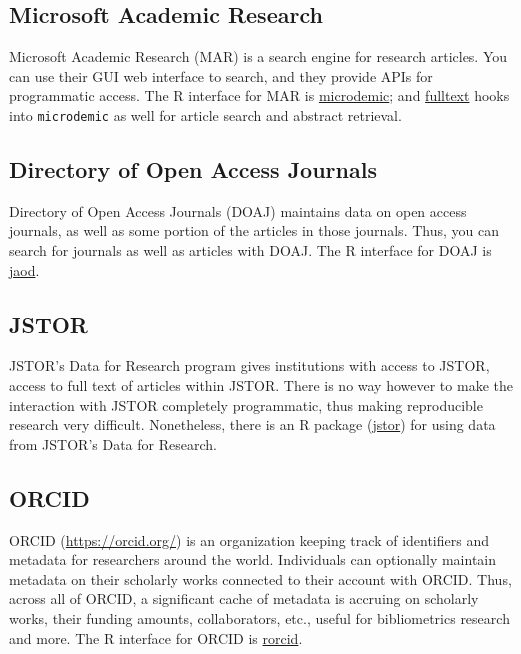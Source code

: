 \documentclass[author-year, review, 11pt]{components/elsarticle} %
\begin{document}
\hypertarget{microsoft-academic-research}{%
\subsection{Microsoft Academic
Research}\label{microsoft-academic-research}}

Microsoft Academic Research (MAR) is a search engine for research
articles. You can use their GUI web interface to search, and they
provide APIs for programmatic access. The R interface for MAR is
\href{https://github.com/ropensci/microdemic}{microdemic}; and
\href{https://github.com/ropensci/fulltext}{fulltext} hooks into
\texttt{microdemic} as well for article search and abstract retrieval.

\hypertarget{directory-of-open-access-journals}{%
\subsection{Directory of Open Access
Journals}\label{directory-of-open-access-journals}}

Directory of Open Access Journals (DOAJ) maintains data on open access
journals, as well as some portion of the articles in those journals.
Thus, you can search for journals as well as articles with DOAJ. The R
interface for DOAJ is \href{https://github.com/ropensci/jaod}{jaod}.

\hypertarget{jstor}{%
\subsection{JSTOR}\label{jstor}}

JSTOR's Data for Research program gives institutions with access to
JSTOR, access to full text of articles within JSTOR. There is no way
however to make the interaction with JSTOR completely programmatic, thus
making reproducible research very difficult. Nonetheless, there is an R
package (\href{https://github.com/ropensci/jstor}{jstor}) for using data
from JSTOR's Data for Research.

\hypertarget{orcid}{%
\subsection{ORCID}\label{orcid}}

ORCID (\url{https://orcid.org/}) is an organization keeping track of
identifiers and metadata for researchers around the world. Individuals
can optionally maintain metadata on their scholarly works connected to
their account with ORCID. Thus, across all of ORCID, a significant cache
of metadata is accruing on scholarly works, their funding amounts,
collaborators, etc., useful for bibliometrics research and more. The R
interface for ORCID is
\href{https://github.com/ropensci/rorcid}{rorcid}.
\end{document}
